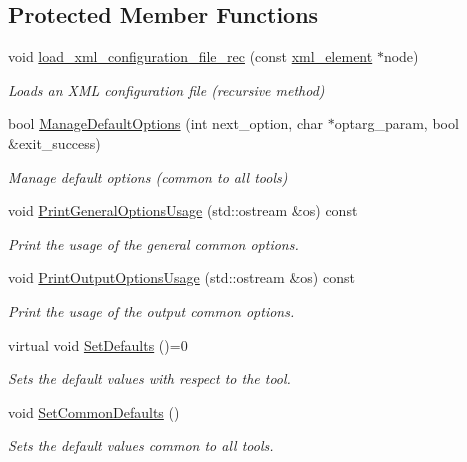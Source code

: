 \subsection*{Protected Member Functions}
\begin{DoxyCompactItemize}
\item 
void \hyperlink{classParameter_a94dba91fe31d3e03c118b67d2d076120}{load\+\_\+xml\+\_\+configuration\+\_\+file\+\_\+rec} (const \hyperlink{classxml__element}{xml\+\_\+element} $\ast$node)
\begin{DoxyCompactList}\small\item\em Loads an X\+ML configuration file (recursive method) \end{DoxyCompactList}\item 
bool \hyperlink{classParameter_acd65faa4f6d3fef6733d6d8a453854a0}{Manage\+Default\+Options} (int next\+\_\+option, char $\ast$optarg\+\_\+param, bool \&exit\+\_\+success)
\begin{DoxyCompactList}\small\item\em Manage default options (common to all tools) \end{DoxyCompactList}\item 
void \hyperlink{classParameter_a5946b2b87c96920a76dfb47ac03300e9}{Print\+General\+Options\+Usage} (std\+::ostream \&os) const
\begin{DoxyCompactList}\small\item\em Print the usage of the general common options. \end{DoxyCompactList}\item 
void \hyperlink{classParameter_a21a62c6800a84e42d12d8c29775d0e05}{Print\+Output\+Options\+Usage} (std\+::ostream \&os) const
\begin{DoxyCompactList}\small\item\em Print the usage of the output common options. \end{DoxyCompactList}\item 
virtual void \hyperlink{classParameter_af2bbff2bbfee25d348bd2f0d796d7b3f}{Set\+Defaults} ()=0
\begin{DoxyCompactList}\small\item\em Sets the default values with respect to the tool. \end{DoxyCompactList}\item 
void \hyperlink{classParameter_a75d63915daccef91941cd50a0dd6f2f1}{Set\+Common\+Defaults} ()
\begin{DoxyCompactList}\small\item\em Sets the default values common to all tools. \end{DoxyCompactList}\item 

\end{DoxyCompactItemize}
